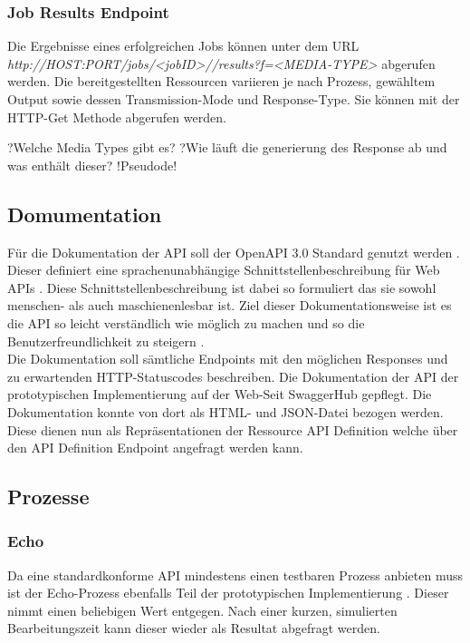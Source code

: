\subsubsection{Job Results Endpoint}
Die Ergebnisse eines erfolgreichen Jobs können unter dem URL \textit{http://HOST:PORT/jobs/<jobID>//results?f=<MEDIA-TYPE>} abgerufen werden. 
Die bereitgestellten Ressourcen variieren je nach Prozess, gewähltem Output sowie dessen Transmission-Mode und Response-Type. Sie können 
mit der HTTP-Get Methode abgerufen werden.

?Welche Media Types gibt es?
?Wie läuft die generierung des Response ab und was enthält dieser?
!Pseudode!

\subsection{Domumentation}
Für die Dokumentation der API soll der OpenAPI 3.0 Standard genutzt werden \cite{ogc_api_processes_core}. 
Dieser definiert eine sprachenunabhängige Schnittstellenbeschreibung für Web APIs \cite{open_api}. 
Diese Schnittstellenbeschreibung ist dabei so formuliert das sie sowohl menschen- als auch maschienenlesbar ist. 
Ziel dieser Dokumentationsweise ist es die API so leicht verständlich wie möglich zu machen und so die Benutzerfreundlichkeit zu steigern \cite{open_api}. \\ 
Die Dokumentation soll sämtliche Endpoints mit den möglichen Responses und zu erwartenden HTTP-Statuscodes beschreiben. 
Die Dokumentation der API der prototypischen Implementierung auf der Web-Seit SwaggerHub gepflegt. Die Dokumentation konnte von dort als HTML- 
und JSON-Datei bezogen werden. Diese dienen nun als Repräsentationen der Ressource API Definition welche über den API Definition Endpoint angefragt werden kann. 

\subsection{Prozesse}
\subsubsection{Echo}
Da eine standardkonforme API mindestens einen testbaren Prozess anbieten muss ist der Echo-Prozess ebenfalls Teil der prototypischen Implementierung \cite{ogc_api_processes_core}. 
Dieser nimmt einen beliebigen Wert entgegen. Nach einer kurzen, simulierten Bearbeitungszeit kann dieser wieder als Resultat abgefragt werden. 

